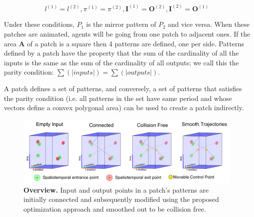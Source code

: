 \begin{equation}
	l^{(1)}=l^{(2)}, \pi^{(1)}=\pi^{(2)}, \mathbf{I}^{(1)} = \mathbf{O}^{(2)}, \mathbf{I}^{(2)} = \mathbf{O}^{(1)}
\end{equation}

Under these conditions, $P_1$ is the mirror pattern of $P_2$ and vice versa.
When these patches are animated, agents will be going from one patch to adjacent ones. 
If the area $\mathbf{A}$ of a patch is a square then 4 patterns are defined, one per side.
Patterns defined by a patch have the property that the sum of the cardinality of all the inputs is the same as the sum of the cardinality of all outputs; we call this the parity condition: $\sum(|inputs|)= \sum(|outputs|)$.

A patch defines a set of patterns, and conversely, a set of patterns that satisfies the parity condition (i.e. all patterns in the set have same period and whose vectors define a convex polygonal area) can be used to create a patch indirectly.

% 


\begin{figure}[ht]
	\begin{center}
	\includegraphics[width=0.9\linewidth]{./images/overview-hd.png}
	\caption{
		\textbf{Overview.} Input and output points in a patch's patterns are initially connected and subsequently modified using the proposed optimization approach and smoothed out to be collision free.
	}
	\label{fig:overview}
	\end{center}
\end{figure}

